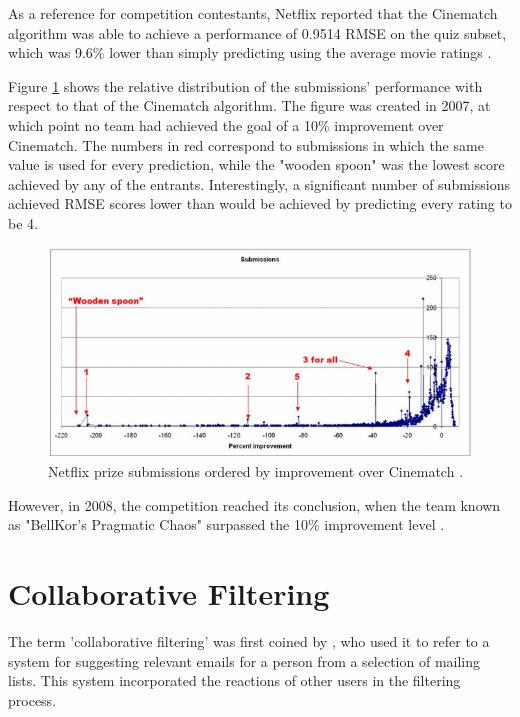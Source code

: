 As a reference for competition contestants, Netflix reported that the Cinematch algorithm was able to achieve a performance of 0.9514 RMSE on the quiz subset, which was 9.6\% lower than simply predicting using the average movie ratings \parencite{netflix_description}.

Figure \ref{fig:netflix_submissions} shows the relative distribution of the submissions' performance with respect to that of the Cinematch algorithm. The figure was created in 2007, at which point no team had achieved the goal of a 10\% improvement over Cinematch. The numbers in red correspond to submissions in which the same value is used for every prediction, while the "wooden spoon" was the lowest score achieved by any of the entrants. Interestingly, a significant number of submissions achieved RMSE scores lower than would be achieved by predicting every rating to be 4.

\begin{figure}[H]
\centering
\includegraphics[width=13cm]{Figures/2_1_netflix-prize.png}
\decoRule
\caption[Netflix submissions]{Netflix prize submissions ordered by improvement over Cinematch \parencite{netflix_description}.}
\label{fig:netflix_submissions}
\end{figure}

However, in 2008, the competition reached its conclusion, when the team known as "BellKor's Pragmatic Chaos" surpassed the 10\% improvement level \parencite{netflix_bellkor}.

\section{Collaborative Filtering}
The term 'collaborative filtering' was first coined by \cite{cf_1.3_origin}, who used it to refer to a system for suggesting relevant emails for a person from a selection of mailing lists. This system incorporated the reactions of other users in the filtering process.

